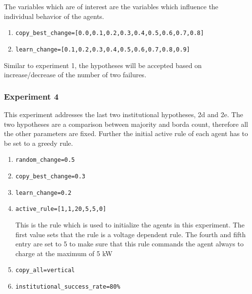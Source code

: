 \documentclass[a4paper]{article}
\begin{document}
The variables which are of interest are the variables which influence the individual behavior of the agents. 
\begin{enumerate}
 \item \begin{alltt}copy_best_change = [0.0,0.1,0.2,0.3,0.4,0.5,0.6,0.7,0.8]\end{alltt}
 \item \begin{alltt}learn_change = [0.1,0.2,0.3,0.4,0.5,0.6,0.7,0.8,0.9]\end{alltt}
\end{enumerate}
Similar to experiment 1, the hypotheses will be accepted based on increase/decrease of the number of two failures.

\subsubsection{Experiment 4}
This experiment addresses the last two institutional hypotheses, 2d and 2e. 
The two hypotheses are a comparison between majority and borda count, therefore all the other parameters 
are fixed. Further the initial active rule of each agent has to be set to a greedy rule. 

\begin{enumerate}
 \item  \begin{alltt}random_change  = 0.5 \end{alltt}
 \item  \begin{alltt}copy_best_change = 0.3\end{alltt}
 \item  \begin{alltt}learn_change = 0.2\end{alltt}
 \item  \begin{alltt}active_rule = [1,1,20,5,5,0]\end{alltt}
 This is the rule which is used to initialize the agents in this experiment. The first value sets that the rule is a 
 voltage dependent rule. The fourth and fifth entry are set to 5 to make sure that this rule commands the agent always to charge 
 at the maximum of 5 kW
 \item  \begin{alltt}copy_all = vertical\end{alltt}
 \item  \begin{alltt}institutional_success_rate = 80 \% \end{alltt}
\end{enumerate}
\end{document}
